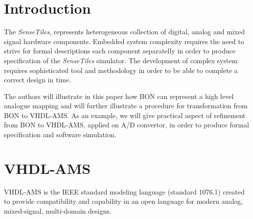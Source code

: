 \documentclass{article}
\newcommand{\STs}{\emph{SenseTiles}\xspace}
\begin{document}
\section{Introduction}
The \STs, represents heterogeneous collection of digital, analog 
and mixed signal hardware components. Embedded system complexity 
requires the need to strive for formal descriptions each component 
separatelly in order to produce specification of the \STs simulator. 
The development of complex system requires sophisticated tool and methodology 
in order to be able to complete a correct design in time.  

The authors will illustrate in this paper how BON can represent a high 
level analogue mapping and will further illustrate a procedure for 
transformation from BON to VHDL-AMS. As an example, 
we will give practical aspect of refinement from BON to VHDL-AMS,
applied on A/D convertor, in order to produce formal specification 
and software simulation.


\section{VHDL-AMS}
VHDL-AMS is the IEEE standard modeling language (standard 1076.1) created 
to provide compatibility and capability in an open language for modern analog, 
mixed-signal, multi-domain designs.
\end{document}
